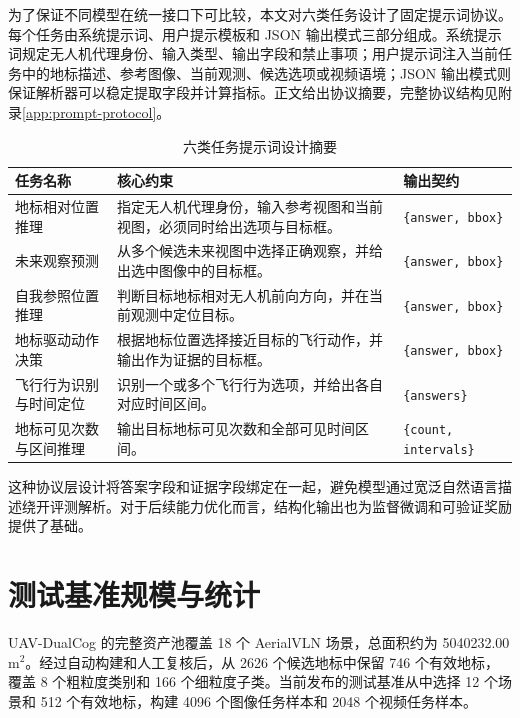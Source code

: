 为了保证不同模型在统一接口下可比较，本文对六类任务设计了固定提示词协议。每个任务由系统提示词、用户提示模板和 JSON 输出模式三部分组成。系统提示词规定无人机代理身份、输入类型、输出字段和禁止事项；用户提示词注入当前任务中的地标描述、参考图像、当前观测、候选选项或视频语境；JSON 输出模式则保证解析器可以稳定提取字段并计算指标。正文给出协议摘要，完整协议结构见附录\autoref{app:prompt-protocol}。

\begin{table}[htbp]
    \centering
    \caption{六类任务提示词设计摘要}
    \label{tab:prompt-summary}
    \begin{tabularx}{\textwidth}{p{3.1cm}X p{3.5cm}}
        \toprule
        任务名称 & 核心约束 & 输出契约 \\
        \midrule
        地标相对位置推理 & 指定无人机代理身份，输入参考视图和当前视图，必须同时给出选项与目标框。 & \texttt{\{answer, bbox\}} \\
        未来观察预测 & 从多个候选未来视图中选择正确观察，并给出选中图像中的目标框。 & \texttt{\{answer, bbox\}} \\
        自我参照位置推理 & 判断目标地标相对无人机前向方向，并在当前观测中定位目标。 & \texttt{\{answer, bbox\}} \\
        地标驱动动作决策 & 根据地标位置选择接近目标的飞行动作，并输出作为证据的目标框。 & \texttt{\{answer, bbox\}} \\
        飞行行为识别与时间定位 & 识别一个或多个飞行行为选项，并给出各自对应时间区间。 & \texttt{\{answers\}} \\
        地标可见次数与区间推理 & 输出目标地标可见次数和全部可见时间区间。 & \texttt{\{count, intervals\}} \\
        \bottomrule
    \end{tabularx}
\end{table}

这种协议层设计将答案字段和证据字段绑定在一起，避免模型通过宽泛自然语言描述绕开评测解析。对于后续能力优化而言，结构化输出也为监督微调和可验证奖励提供了基础。

\section{测试基准规模与统计}

UAV-DualCog 的完整资产池覆盖 18 个 AerialVLN 场景，总面积约为 5040232.00 m\(^2\)。经过自动构建和人工复核后，从 2626 个候选地标中保留 746 个有效地标，覆盖 8 个粗粒度类别和 166 个细粒度子类。当前发布的测试基准从中选择 12 个场景和 512 个有效地标，构建 4096 个图像任务样本和 2048 个视频任务样本。

